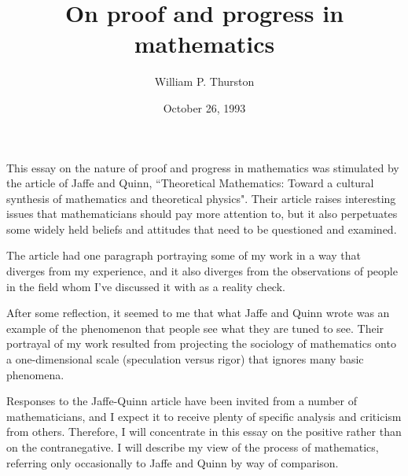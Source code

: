 


\def\currentvolume{30}
\def\currentissue{2}
\def\currentyear{1994}
\def\currentmonth{April}
\def\copyrightyear{1994}
\def\currentpages{161-177}
\title{On proof and progress in mathematics}
\author{William P. Thurston}
\date{October 26, 1993}
\maketitle

This essay on the nature of proof and progress in 
mathematics was 
stimulated by the article of Jaffe and Quinn, 
``Theoretical Mathematics: 
Toward a cultural synthesis of mathematics and theoretical 
physics".
Their article raises interesting issues that 
mathematicians should pay more
attention to, but it also perpetuates some widely held
beliefs and attitudes that need to be questioned and 
examined.

The article had one paragraph portraying some of my work 
in a way
that diverges from my experience, and it also diverges 
from the observations
of people in the field whom I've discussed it with as a 
reality check.

After some reflection, it seemed to me that what Jaffe and 
Quinn
wrote was an example of the phenomenon that people see 
what they are
tuned to see. Their portrayal of my work resulted from
projecting the sociology of mathematics onto a 
one-dimensional
scale (speculation versus rigor) that ignores many basic 
phenomena.

Responses to the Jaffe-Quinn article have been invited 
from a number
of mathematicians, and I expect it to receive plenty of 
specific analysis
and criticism from others.  Therefore, I will concentrate 
in this essay
on the positive rather than on the contranegative.
I will describe my view of the process of mathematics, 
referring
only occasionally to Jaffe and Quinn by way of comparison.

